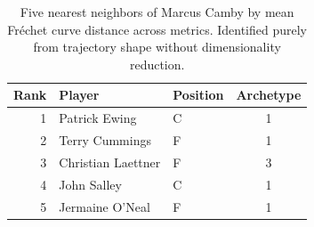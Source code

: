 \begin{table}[htbp]
  \centering\small
  \begin{tabular}{rllc}
    \toprule
    Rank & Player & Position & Archetype \\
    \midrule
    1 & Patrick Ewing & C & 1 \\
    2 & Terry Cummings & F & 1 \\
    3 & Christian Laettner & F & 3 \\
    4 & John Salley & C & 1 \\
    5 & Jermaine O'Neal & F & 1 \\
    \bottomrule
  \end{tabular}
  \caption{Five nearest neighbors of Marcus Camby by mean Fr\'{e}chet curve distance across metrics. Identified purely from trajectory shape without dimensionality reduction.}
  \label{tab:Marcus_Camby_frechet_curve_neighbors}
\end{table}

